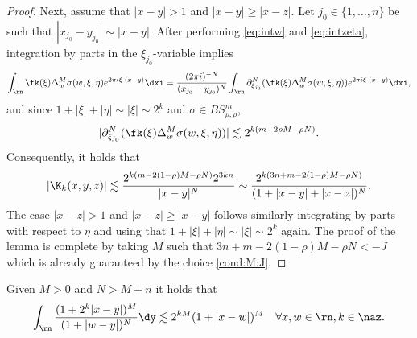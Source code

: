 \begin{proof}
Next, assume that $|x-y| > 1$ and $|x-y| \geq |x-z|$. Let $j_0 \in \{1, \ldots, n\}$ be such that $|x_{j_0} - y_{j_0}| \sim |x-y|$. After performing \eqref{eq:intw} and \eqref{eq:intzeta}, integration by parts in the $\xi_{j_0}$-variable implies 
$$
\int_{\rn} \fk(\xi) \Delta_w^M\sigma(w, \xi, \eta) e^{2\pi i \xi \cdot( x- y)} \dxi = \frac{(2\pi i )^{-N}}{(x_{j_0} - y_{j_0})^{N}} \int_{\rn} \partial_{\xi_{j_0}}^N (\fk(\xi)  \Delta_w^M\sigma(w, \xi, \eta)) e^{2\pi i \xi \cdot( x- y)} \dxi,
$$
and since $1+|\xi| + |\eta| \sim |\xi| \sim 2^k$ and $\sigma  \in BS^m_{\rho, \rho}$,
$$
|\partial_{\xi_{j_0}}^N  (\fk(\xi)  \Delta_w^M\sigma(w, \xi, \eta))| \lesssim 2^{k (m +2 \rho M -  \rho N)}.
$$
Consequently, it holds that
$$
|\K_k(x,y,z)| \lesssim \frac{2^{k(m- 2 (1-\rho)M - \rho N)} 2^{3kn}}{|x-y|^{N}} \sim \frac{2^{k(3n +m- 2 (1-\rho)M - \rho N)}}{(1+ |x-y| + |x-z|)^{N}}. 
$$
The case $|x-z| > 1$ and $|x-z| \geq |x-y|$ follows similarly integrating by parts with respect to $\eta$ and using that $1+|\xi| + |\eta| \sim |\xi| \sim 2^k$ again. The proof of the lemma is complete by taking $M$ such that $3n +m- 2 (1-\rho)M - \rho N < - J$ which is already guaranteed by the choice \eqref{cond:M:J}. 
 \end{proof}


\begin{lemma}\label{lem:int:M:N:k} Given $M >0$ and $N > M + n$ it holds that
\begin{equation*}
\int_{\rn} \frac{(1+ 2^k |x-y|)^M}{(1+ |w - y|)^N} \dy \lesssim 2^{kM} (1 + |x-w|)^M  \quad \forall x, w \in \rn, k \in \naz.
\end{equation*}
\end{lemma}


